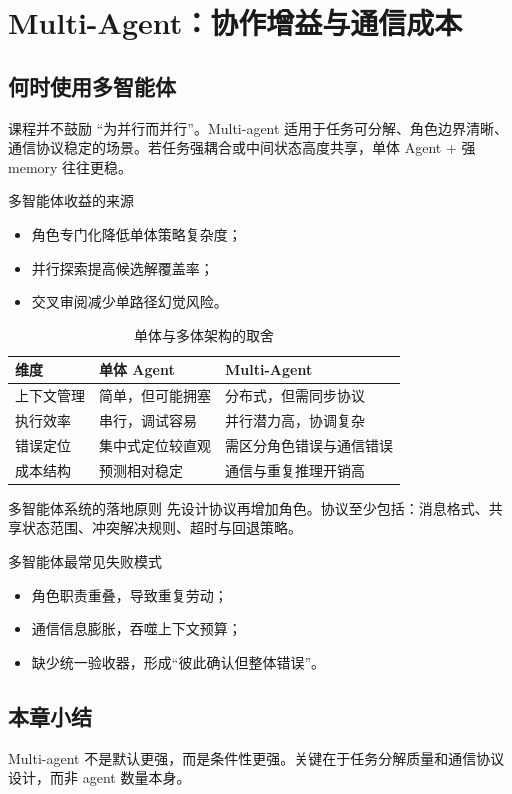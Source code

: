 \section{Multi-Agent：协作增益与通信成本}

\subsection{何时使用多智能体}
课程并不鼓励 ``为并行而并行''。Multi-agent 适用于任务可分解、角色边界清晰、通信协议稳定的场景。若任务强耦合或中间状态高度共享，单体 Agent + 强 memory 往往更稳。

\begin{knowledgebox}{多智能体收益的来源}
\begin{itemize}
    \item 角色专门化降低单体策略复杂度；
    \item 并行探索提高候选解覆盖率；
    \item 交叉审阅减少单路径幻觉风险。
\end{itemize}
\end{knowledgebox}

\begin{table}[H]
\centering
\begin{tabular}{p{3.3cm}p{3.8cm}p{3.9cm}}
\toprule
\textbf{维度} & \textbf{单体 Agent} & \textbf{Multi-Agent} \\
\midrule
上下文管理 & 简单，但可能拥塞 & 分布式，但需同步协议 \\
执行效率 & 串行，调试容易 & 并行潜力高，协调复杂 \\
错误定位 & 集中式定位较直观 & 需区分角色错误与通信错误 \\
成本结构 & 预测相对稳定 & 通信与重复推理开销高 \\
\bottomrule
\end{tabular}
\caption{单体与多体架构的取舍}
\end{table}

\begin{importantbox}{多智能体系统的落地原则}
先设计协议再增加角色。协议至少包括：消息格式、共享状态范围、冲突解决规则、超时与回退策略。
\end{importantbox}

\begin{warningbox}{多智能体最常见失败模式}
\begin{itemize}
    \item 角色职责重叠，导致重复劳动；
    \item 通信信息膨胀，吞噬上下文预算；
    \item 缺少统一验收器，形成“彼此确认但整体错误”。
\end{itemize}
\end{warningbox}

\subsection{本章小结}
Multi-agent 不是默认更强，而是条件性更强。关键在于任务分解质量和通信协议设计，而非 agent 数量本身。

